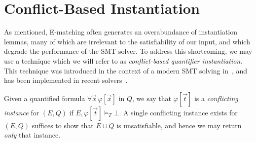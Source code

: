 \documentclass[oribibl]{llncs}
\begin{document}
\section{Conflict-Based Instantiation}
\label{sec:cbqi}

As mentioned, E-matching often generates an overabundance of instantiation lemmas, 
many of which are irrelevant to the satisfiability of our input,
and which degrade the performance of the SMT solver.
To address this shortcoming, we may use a technique which we will refer to as \emph{conflict-based quantifier instantiation}.
This technique was introduced in the context of a modern SMT solving in~\cite{}, and has been implemented in recent solvers~\cite{}.

Given a quantified formula $\forall \vec x\, \varphi[ \vec x ]$ in $Q$,
we say that $\varphi[ \vec t ]$ is a \emph{conflicting instance} for $( E, Q )$ if $E, \varphi[ \vec t ] \models_T \bot$.
A single conflicting instance exists for $(E, Q )$ suffices to show that $E \cup Q$ is unsatisfiable,
and hence we may return \emph{only} that instance.
\end{document}
